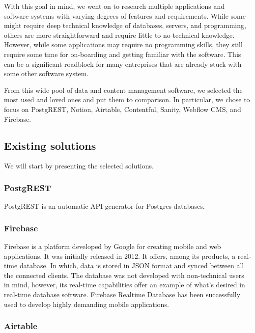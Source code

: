With this goal in mind, we went on to research multiple applications and software systems with varying degrees of features and requirements.
While some might require deep technical knowledge of databases, servers, and programming, others are more straightforward and require little to no technical knowledge.
However, while some applications may require no programming skills, they still require some time for on-boarding and getting familiar with the software.
This can be a significant roadblock for many entreprises that are already stuck with some other software system.

From this wide pool of data and content management software, we selected the most used and loved ones and put them to comparison. In particular, we chose to focus on PostgREST, Notion, Airtable, Contentful, Sanity, Webflow CMS, and Firebase.

\subsection{Existing solutions}

We will start by presenting the selected solutions.

\subsubsection{PostgREST}


PostgREST is an automatic API generator for Postgres databases.


\subsubsection{Firebase}


Firebase is a platform developed by Google for creating mobile and web
applications. It was initially released in 2012. It offers, among its
products, a real-time database. In which, data is stored in JSON format
and synced between all the connected clients. The database was not
developed with non-technical users in mind, however, its real-time
capabilities offer an example of what's desired in real-time database
software. Firebase Realtime Database has been successfully used to
develop highly demanding mobile applications.

\subsubsection{Airtable}

